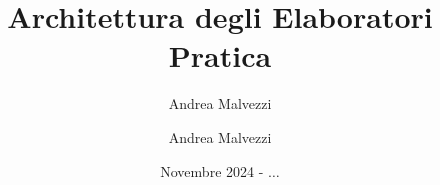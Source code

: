 \documentclass[12pt]{article}
\author{Andrea Malvezzi}
\title{\textbf{Architettura degli Elaboratori\\ Pratica}}
\date{Novembre 2024 - $\dots$}
\author{Andrea Malvezzi}
\begin{document}
\maketitle
\pagebreak
\tableofcontents
\pagebreak

\section{}
\end{document}
